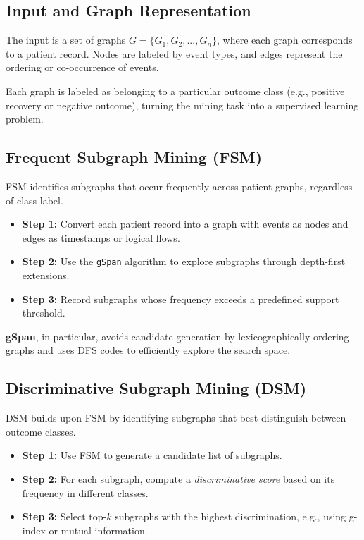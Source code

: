 \documentclass[12pt]{article}
\begin{document}
\subsection*{Input and Graph Representation}
The input is a set of graphs $G = \{G_1, G_2, ..., G_n\}$, where each graph corresponds to a patient record. Nodes are labeled by event types, and edges represent the ordering or co-occurrence of events.

Each graph is labeled as belonging to a particular outcome class (e.g., positive recovery or negative outcome), turning the mining task into a supervised learning problem.

\subsection*{Frequent Subgraph Mining (FSM)}
FSM identifies subgraphs that occur frequently across patient graphs, regardless of class label.

\begin{itemize}
    \item \textbf{Step 1:} Convert each patient record into a graph with events as nodes and edges as timestamps or logical flows.
    \item \textbf{Step 2:} Use the \texttt{gSpan} algorithm to explore subgraphs through depth-first extensions.
    \item \textbf{Step 3:} Record subgraphs whose frequency exceeds a predefined support threshold.
\end{itemize}

\textbf{gSpan}, in particular, avoids candidate generation by lexicographically ordering graphs and uses DFS codes to efficiently explore the search space.

\subsection*{Discriminative Subgraph Mining (DSM)}
DSM builds upon FSM by identifying subgraphs that best distinguish between outcome classes.

\begin{itemize}
    \item \textbf{Step 1:} Use FSM to generate a candidate list of subgraphs.
    \item \textbf{Step 2:} For each subgraph, compute a \textit{discriminative score} based on its frequency in different classes.
    \item \textbf{Step 3:} Select top-$k$ subgraphs with the highest discrimination, e.g., using g-index or mutual information.
\end{itemize}
\end{document}
